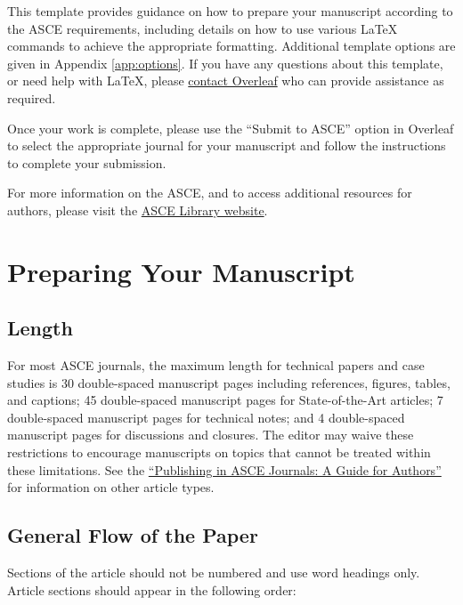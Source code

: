 \documentclass[Journal,letterpaper,NoLineNumbers]{ascelike-new}
\begin{document}
This template provides guidance on how to prepare your manuscript according to the ASCE requirements, including details on how to use various LaTeX commands to achieve the appropriate formatting. Additional template options are given in Appendix \ref{app:options}. If you have any questions about this template, or need help with LaTeX, please \href{https://www.overleaf.com/contact}{contact Overleaf} who can provide assistance as required.

Once your work is complete, please use the ``Submit to ASCE'' option in Overleaf to select the appropriate journal for your manuscript and follow the instructions to complete your submission.

For more information on the ASCE, and to access additional resources for authors, please visit the \href{http://ascelibrary.org/page/authors}{ASCE Library website}.

\section{Preparing Your Manuscript}

\subsection{Length}

For most ASCE journals, the maximum length for technical papers and case studies is 30 double-spaced manuscript pages including references, figures, tables, and captions; 45 double-spaced manuscript pages for State-of-the-Art articles; 7 double-spaced manuscript pages for technical notes; and 4 double-spaced manuscript pages for discussions and closures. The editor may waive these restrictions to encourage manuscripts on topics that cannot be treated within these limitations.  See the \href{https://ascelibrary.org/author-center/journal#about}{``Publishing in ASCE Journals: A Guide for Authors''} for information on other article types.

\subsection{General Flow of the Paper}

Sections of the article should not be numbered and use word headings only. Article sections should appear in the following order:
\end{document}
